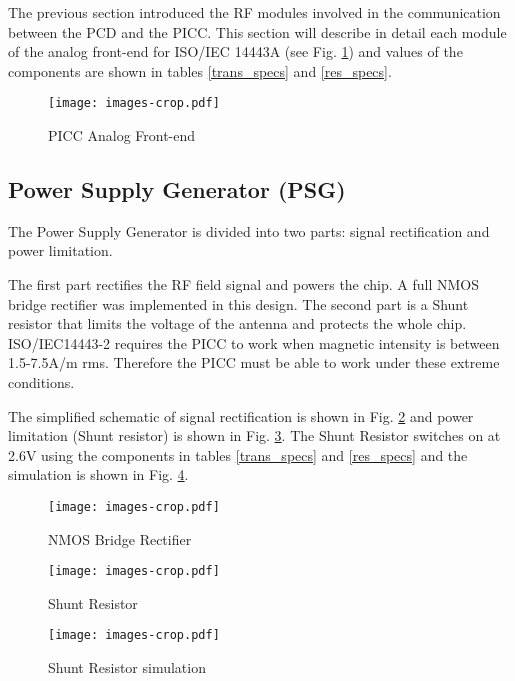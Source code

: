The previous section introduced the RF modules involved in the communication between the PCD and the PICC. This section will describe in detail each module of the analog front-end for ISO/IEC 14443A (see Fig. \ref{fig:afe}) and values of the components are shown in tables \ref{trans_specs} and \ref{res_specs}.

\begin{figure}[]
  \centering
  \texttt{[image: images-crop.pdf]}
  \caption{PICC Analog Front-end}
  \label{fig:afe}
\end{figure}

\subsection{Power Supply Generator (PSG)}

The Power Supply Generator is divided into two parts: signal rectification and power limitation.

The first part rectifies the RF field signal and powers the chip. A full NMOS bridge rectifier \cite{rfid_rect1}\cite{rfid_rect2} was implemented in this design. The second part is a Shunt resistor that limits the voltage of the antenna and protects the whole chip. ISO/IEC14443-2 requires the PICC to work when magnetic intensity is between 1.5-7.5A/m rms. Therefore the PICC must be able to work under these extreme conditions.  

The simplified schematic of signal rectification is shown in Fig. \ref{fig:rect} and power limitation (Shunt resistor) is shown in Fig. \ref{fig:shunt}. The Shunt Resistor switches on at 2.6V using the components in tables \ref{trans_specs} and \ref{res_specs} and the simulation is shown in Fig. \ref{fig:shunt_sim}.

\begin{figure}[h]
  \centering
  \texttt{[image: images-crop.pdf]}
  \caption{NMOS Bridge Rectifier}
  \label{fig:rect}
\end{figure}

\begin{figure}[h]
  \centering
  \texttt{[image: images-crop.pdf]}
  \caption{Shunt Resistor}
  \label{fig:shunt}
\end{figure}

\begin{figure}[h]
  \centering
  \texttt{[image: images-crop.pdf]}
  \caption{Shunt Resistor simulation}
  \label{fig:shunt_sim}
\end{figure}

